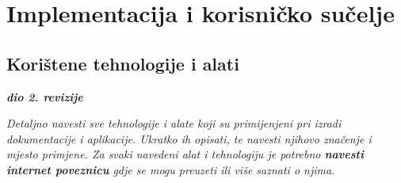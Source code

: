 \chapter{Implementacija i korisničko sučelje}
		
		
		\section{Korištene tehnologije i alati}
		
			\textbf{\textit{dio 2. revizije}}
			
			 \textit{Detaljno navesti sve tehnologije i alate koji su primijenjeni pri izradi dokumentacije i aplikacije. Ukratko ih opisati, te navesti njihovo značenje i mjesto primjene. Za svaki navedeni alat i tehnologiju je potrebno \textbf{navesti internet poveznicu} gdje se mogu preuzeti ili više saznati o njima}.
			
			
			\eject 
			
